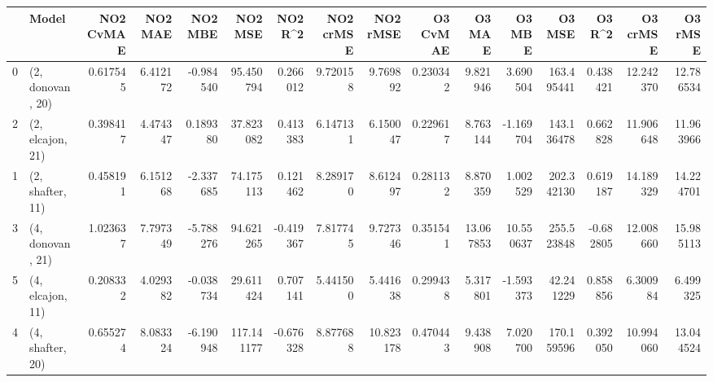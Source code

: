 \begin{tabular}{llrrrrrrrrrrrrrr}
\toprule
{} &             Model &  NO2 CvMAE &   NO2 MAE &   NO2 MBE &     NO2 MSE &   NO2 R\textasciicircum2 &  NO2 crMSE &   NO2 rMSE &  O3 CvMAE &     O3 MAE &     O3 MBE &      O3 MSE &    O3 R\textasciicircum2 &   O3 crMSE &    O3 rMSE \\
\midrule
0 &  (2, donovan, 20) &   0.617545 &  6.412172 & -0.984540 &   95.450794 &  0.266012 &   9.720158 &   9.769892 &  0.230342 &   9.821946 &   3.690504 &  163.495441 &  0.438421 &  12.242370 &  12.786534 \\
2 &  (2, elcajon, 21) &   0.398417 &  4.474347 &  0.189380 &   37.823082 &  0.413383 &   6.147131 &   6.150047 &  0.229617 &   8.763144 &  -1.169704 &  143.136478 &  0.662828 &  11.906648 &  11.963966 \\
1 &  (2, shafter, 11) &   0.458191 &  6.151268 & -2.337685 &   74.175113 &  0.121462 &   8.289170 &   8.612497 &  0.281132 &   8.870359 &   1.002529 &  202.342130 &  0.619187 &  14.189329 &  14.224701 \\
3 &  (4, donovan, 21) &   1.023637 &  7.797349 & -5.788276 &   94.621265 & -0.419367 &   7.817745 &   9.727346 &  0.351541 &  13.067853 &  10.550637 &  255.523848 & -0.682805 &  12.008660 &  15.985113 \\
5 &  (4, elcajon, 11) &   0.208332 &  4.029382 & -0.038734 &   29.611424 &  0.707141 &   5.441500 &   5.441638 &  0.299438 &   5.317801 &  -1.593373 &   42.241229 &  0.858856 &   6.300984 &   6.499325 \\
4 &  (4, shafter, 20) &   0.655274 &  8.083324 & -6.190948 &  117.141177 & -0.676328 &   8.877688 &  10.823178 &  0.470443 &   9.438908 &   7.020700 &  170.159596 &  0.392050 &  10.994060 &  13.044524 \\
\bottomrule
\end{tabular}
